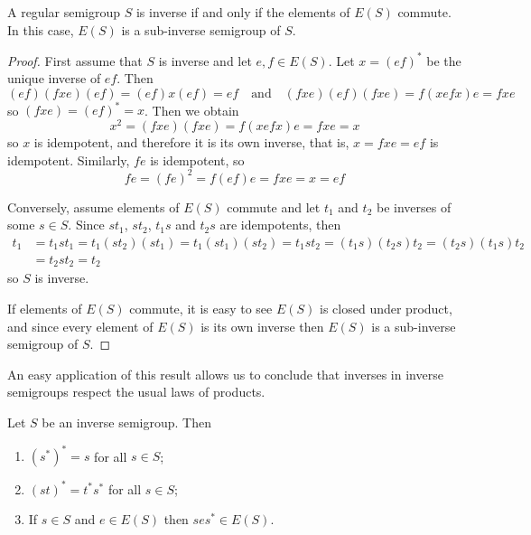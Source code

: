 \begin{theorem}\label{theoreminverseiffescommute}
A regular semigroup $S$ is inverse if and only if the elements of $E(S)$ commute. In this case, $E(S)$ is a sub-inverse semigroup of $S$.
\end{theorem}
\begin{proof}
First assume that $S$ is inverse and let $e,f\in E(S)$. Let $x=(ef)^*$ be the unique inverse of $ef$. Then
\[(ef)(fxe)(ef)=(ef)x(ef)=ef\quad\text{and}\quad (fxe)(ef)(fxe)=f(xefx)e=fxe\]
so $(fxe)=(ef)^*=x$. Then we obtain
\[x^2=(fxe)(fxe)=f(xefx)e=fxe=x\]
so $x$ is idempotent, and therefore it is its own inverse, that is, $x=fxe=ef$ is idempotent. Similarly, $fe$ is idempotent, so
\[fe=(fe)^2=f(ef)e=fxe=x=ef\]

Conversely, assume elements of $E(S)$ commute and let $t_1$ and $t_2$ be inverses of some $s\in S$. Since $st_1$, $st_2$, $t_1s$ and $t_2s$ are idempotents, then
\begin{align*}
t_1&=t_1st_1=t_1(st_2)(st_1)=t_1(st_1)(st_2)=t_1st_2=(t_1s)(t_2s)t_2=(t_2s)(t_1s)t_2\\
&=t_2st_2=t_2
\end{align*}
so $S$ is inverse.

If elements of $E(S)$ commute, it is easy to see $E(S)$ is closed under product, and since every element of $E(S)$ is its own inverse then $E(S)$ is a sub-inverse semigroup of $S$.\qedhere
\end{proof}

An easy application of this result allows us to conclude that inverses in inverse semigroups respect the usual laws of products.

\begin{corollary}\label{theorempropertiesofinversesinsemigroups}
Let $S$ be an inverse semigroup. Then
\begin{enumerate}
\item[(a)] $(s^*)^*=s$ for all $s\in S$;
\item[(b)] $(st)^*=t^*s^*$ for all $s\in S$;
\item[(c)] If $s\in S$ and $e\in E(S)$ then $ses^*\in E(S)$.
\end{enumerate}
\end{corollary}



